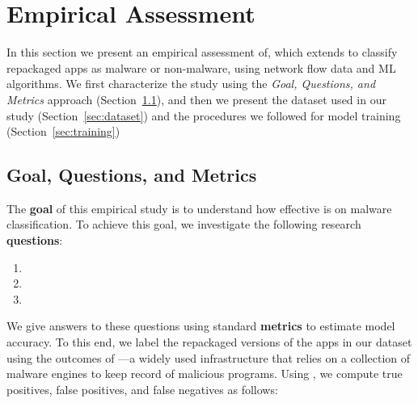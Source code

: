 \section{Empirical Assessment}\label{sec:empirical-study}

In this section we present an empirical assessment of\droidxpflow, which extends \droidxp to classify
repackaged apps as malware or non-malware, using network flow data and ML algorithms.
We first characterize the study using the \emph{Goal, Questions, and Metrics} approach (Section~\ref{sec:gqm}),
and then we present the dataset used in our study (Section~\ref{sec:dataset}) and the procedures
we followed for model training (Section~\ref{sec:training})


\subsection{Goal, Questions, and Metrics}\label{sec:gqm}

The {\bf goal} of this empirical study is to understand how effective is \droidxpflow on malware classification.
To achieve this goal, we investigate the following research {\bf questions}:


\begin{enumerate}[(RQ1)]
\item \rqa
\item \rqb
\item \rqc
\end{enumerate}

We give answers to these questions using standard {\bf metrics} to estimate
model accuracy. To this end, we label the repackaged versions
of the apps in our dataset using the outcomes of \vt---a widely used
infrastructure that relies on a collection of malware engines to keep
record of malicious programs. Using \vt, we compute true positives,
false positives, and false negatives as follows:


